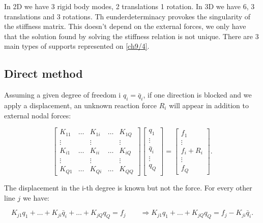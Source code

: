 	In 2D we have 3 rigid body modes, 2 translations 1 rotation. In 3D we have 6, 3 translations and 3 rotations. Th eunderdeterminacy provokes the singularity of the stiffness matrix. This doesn't depend on the external forces, we only have that the solution found by solving the stiffness relation is not unique. There are 3 main types of supports represented on \autoref{ch9/4}.
	
\subsection{Direct method}
	Assuming a given degree of freedom i $q_i = \bar{q}_i$, if one direction is blocked and we apply a displacement, an unknown reaction force $R_i$ will appear in addition to external nodal forces: 
	
	\begin{equation}
	\left[
	\begin{array}{ccccc}
	K_{11} & \dots & K_{1i} & \dots & K_{1Q}\\
	\vdots & & \vdots & & \vdots\\
	K_{i1}& \dots & K_{ii} & \dots & K_{iQ}\\
	\vdots & & \vdots & & \vdots\\
	K_{Q1}& \dots & K_{Qi} & \dots & K_{QQ}
	\end{array}
	\right]
	\left[
	\begin{array}{c}
	q_{1}\\
	\vdots\\
	\bar{q}_{i}\\
	\vdots\\
	q_Q\\
	\end{array}
	\right]
	=
	\left[
	\begin{array}{c}
	f_{1}\\
	\vdots\\
	f_i + R_i\\
	\vdots\\
	f_Q
	\end{array}
	\right].
	\end{equation}
	
	The displacement in the i-th degree is known but not the force. For every other line $j$ we have:
	
	\begin{equation}
	K_{j1}q_1 + \dots + K_{ji}\bar{q}_i + \dots + K_{jQ}q_Q = f_j \qquad \Rightarrow K_{j1}q_1 + \dots + K_{jQ}q_Q = f_j - K_{ji}\bar{q}_i.
	\end{equation}
	
